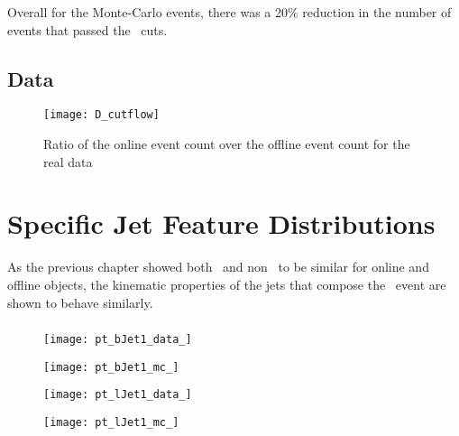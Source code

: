 	Overall for the Monte-Carlo events, there was a 20\% reduction in the number of events that passed the \VBFHBB\, cuts.










	\subsection{Data}
		\begin{figure}[h]
			\centering
			\texttt{[image: D\_cutflow]}
			\caption{Ratio of the online event count over the offline event count for the real data}
			\label{f:cutflowMC}
		\end{figure}




\section{Specific Jet Feature Distributions}

	As the previous chapter showed both \bjets\, and non \bjets\, to be similar for online and offline objects, the kinematic properties of the jets that compose the \VBFHBB\, event are shown to behave similarly.

		\subsubsection{\pt}

			\begin{figure}[h]
				\centering

				\begin{minipage}[h]{0.33\linewidth}
					\texttt{[image: pt\_bJet1\_data\_]}
				\end{minipage}
				\quad
				\begin{minipage}[h]{0.33\linewidth}
					\texttt{[image: pt\_bJet1\_mc\_]}
				\end{minipage}

				\begin{minipage}[h]{0.33\linewidth}
					\texttt{[image: pt\_lJet1\_data\_]}
				\end{minipage}
				\quad
				\begin{minipage}[h]{0.33\linewidth}
					\texttt{[image: pt\_lJet1\_mc\_]}
				\end{minipage}

			\end{figure}



